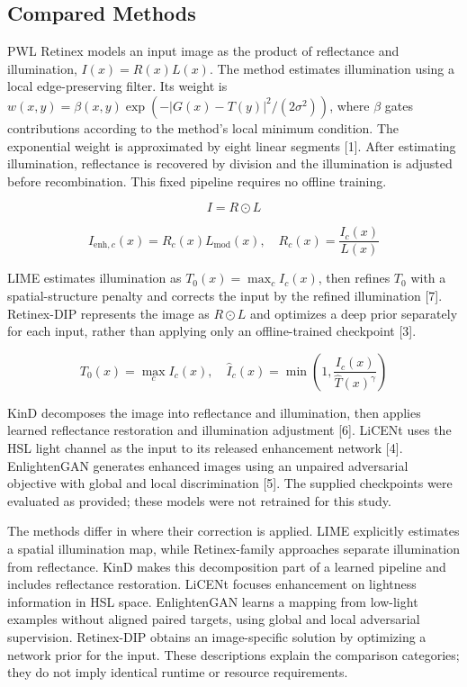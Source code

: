 \documentclass[conference]{IEEEtran}
\begin{document}
\subsection{Compared Methods}

PWL Retinex models an input image as the product of reflectance and illumination, $I(x)=R(x)L(x)$. The method estimates illumination using a local edge-preserving filter. Its weight is $w(x,y)=\beta(x,y)\exp(-|G(x)-T(y)|^2/(2\sigma^2))$, where $\beta$ gates contributions according to the method’s local minimum condition. The exponential weight is approximated by eight linear segments [1]. After estimating illumination, reflectance is recovered by division and the illumination is adjusted before recombination. This fixed pipeline requires no offline training.

\begin{equation}I=R\odot L\tag{1}\end{equation}

\begin{equation}I_{\mathrm{enh},c}(x)=R_c(x)L_{\mathrm{mod}}(x),\quad R_c(x)=\frac{I_c(x)}{L(x)}\tag{2}\end{equation}

LIME estimates illumination as $T_0(x)=\max_c I_c(x)$, then refines $T_0$ with a spatial-structure penalty and corrects the input by the refined illumination [7]. Retinex-DIP represents the image as $R\odot L$ and optimizes a deep prior separately for each input, rather than applying only an offline-trained checkpoint [3].

\begin{equation}T_0(x)=\max_c I_c(x),\quad \hat I_c(x)=\min\left(1,\frac{I_c(x)}{\hat T(x)^\gamma}\right)\tag{3}\end{equation}

KinD decomposes the image into reflectance and illumination, then applies learned reflectance restoration and illumination adjustment [6]. LiCENt uses the HSL light channel as the input to its released enhancement network [4]. EnlightenGAN generates enhanced images using an unpaired adversarial objective with global and local discrimination [5]. The supplied checkpoints were evaluated as provided; these models were not retrained for this study.

The methods differ in where their correction is applied. LIME explicitly estimates a spatial illumination map, while Retinex-family approaches separate illumination from reflectance. KinD makes this decomposition part of a learned pipeline and includes reflectance restoration. LiCENt focuses enhancement on lightness information in HSL space. EnlightenGAN learns a mapping from low-light examples without aligned paired targets, using global and local adversarial supervision. Retinex-DIP obtains an image-specific solution by optimizing a network prior for the input. These descriptions explain the comparison categories; they do not imply identical runtime or resource requirements.
\end{document}
